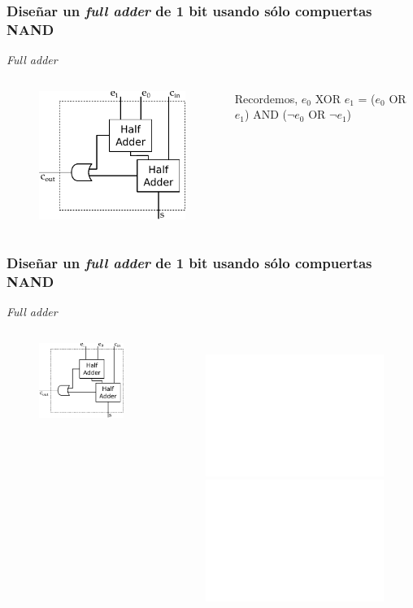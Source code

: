 \documentclass[mathserif,hyperref]{beamer}
\begin{document}
\begin{frame}[t]
\frametitle{\small Diseñar un \textit{full adder} de 1 bit usando sólo
compuertas NAND}
\textit{Full adder}
\begin{columns}[T]
  \begin{figure}[htp]
    \includegraphics[scale=0.6]{fulladder.pdf}
  \end{figure}

  Recordemos, $e_0$ XOR $e_1$ = ($e_0$ OR $e_1$) AND ($\lnot e_0$ OR $\lnot
  e_1$)
\end{columns}
\end{frame}


\begin{frame}[t]
\frametitle{\small Diseñar un \textit{full adder} de 1 bit usando sólo
compuertas NAND}
\textit{Full adder}
\begin{columns}[T]
  \begin{figure}[htp]
    \includegraphics[scale=0.9]{fulladder.pdf}
  \end{figure}

  \begin{figure}[htp]
    \includegraphics<1>[scale=0.9]{halfadder.pdf}
    \includegraphics<2>[scale=0.9]{fulladder.pdf}
  \end{figure}
\end{columns}
\end{frame}
\end{document}
